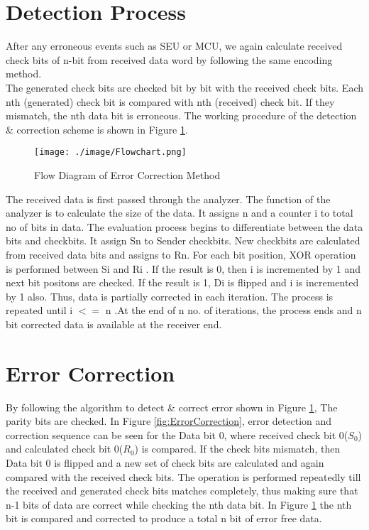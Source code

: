 \documentclass[12pt,a4paper]{report}
\begin{document}
 \section{Detection Process}
 After any erroneous events such as SEU or MCU, we again calculate received check bits of n-bit from received data word by following the same encoding method.\\
 The generated check bits are checked bit by bit with the received check bits. Each nth (generated) check bit is compared with nth (received) check bit. If they mismatch, the nth data bit is erroneous. The working procedure of the detection \& correction scheme is shown in Figure \ref{fig:Flowchart}.\\
 
  \begin{figure}
   \centering
    \texttt{[image: ./image/Flowchart.png]}
    \caption{Flow Diagram of Error Correction Method}
    \label{fig:Flowchart}
   \end{figure}
 
 The received data is first passed through the analyzer. The function of the analyzer is to calculate the size of the data. It assigns n and a counter i to total no of bits in data. The evaluation process begins to differentiate between the data bits and checkbits. It assign Sn to Sender checkbits. New checkbits are calculated from received data bits and assigns to Rn. For each bit position, XOR operation is performed between Si and Ri . If the result is 0, then i is incremented by 1 and next bit positons are checked. If the result is 1, Di is flipped and i is incremented by 1 also. Thus, data is partially corrected in each 
 iteration. The process is repeated until  i $<=$ n .At the end of n no. of iterations, the process ends and n bit corrected data is available at the receiver end.
 
 \section{Error Correction}
By following the algorithm to detect \& correct error shown in Figure \ref{fig:Flowchart}, The parity bits are checked. In Figure \ref{fig:ErrorCorrection}, error detection and correction sequence can be seen for the Data bit 0, where received check bit 0($S_0$) and calculated check bit 0($R_0$) is compared. If the check bits mismatch, then Data bit 0 is flipped and a new set of check bits are calculated and again compared with the received check bits. The operation is performed repeatedly till the received and generated check bits matches completely, thus making sure that n-1 bits of data are correct while checking the nth data bit. In Figure \ref{fig:Flowchart} the nth bit is compared and corrected to produce a total n bit of error free data.
\end{document}
